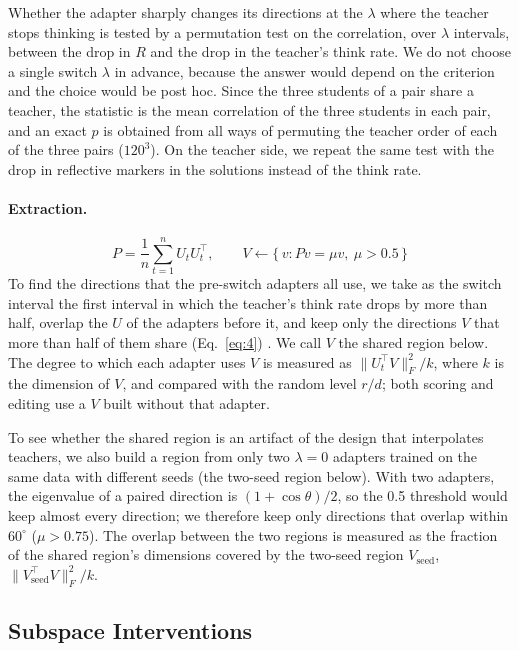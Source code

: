 Whether the adapter sharply changes its directions at the $\lambda$ where the teacher stops thinking is tested by a permutation test on the correlation, over $\lambda$ intervals, between the drop in $R$ and the drop in the teacher's think rate.
We do not choose a single switch $\lambda$ in advance, because the answer would depend on the criterion and the choice would be post hoc.
Since the three students of a pair share a teacher, the statistic is the mean correlation of the three students in each pair, and an exact $p$ is obtained from all ways of permuting the teacher order of each of the three pairs ($120^3$).
On the teacher side, we repeat the same test with the drop in reflective markers in the solutions instead of the think rate.

\paragraph{Extraction.}
\begin{equation}
P = \frac{1}{n}\sum_{t=1}^{n} U_t U_t^\top,\qquad V \leftarrow \{\,v : Pv = \mu v,\ \mu > 0.5\,\}
\label{eq:4}
\end{equation}
To find the directions that the pre-switch adapters all use, we take as the switch interval the first interval in which the teacher's think rate drops by more than half, overlap the $U$ of the adapters before it, and keep only the directions $V$ that more than half of them share (Eq.~\eqref{eq:4}) \citep{gerasimov2026unstable}. We call $V$ the shared region below.
The degree to which each adapter uses $V$ is measured as $\lVert U_t^\top V \rVert_F^2 / k$, where $k$ is the dimension of $V$, and compared with the random level $r/d$; both scoring and editing use a $V$ built without that adapter.

To see whether the shared region is an artifact of the design that interpolates teachers, we also build a region from only two $\lambda=0$ adapters trained on the same data with different seeds (the two-seed region below).
With two adapters, the eigenvalue of a paired direction is $(1+\cos\theta)/2$, so the 0.5 threshold would keep almost every direction; we therefore keep only directions that overlap within $60^\circ$ ($\mu > 0.75$).
The overlap between the two regions is measured as the fraction of the shared region's dimensions covered by the two-seed region $V_{\text{seed}}$, $\lVert V_{\text{seed}}^\top V \rVert_F^2 / k$.

\subsection{Subspace Interventions}
\label{sec:interventions}

